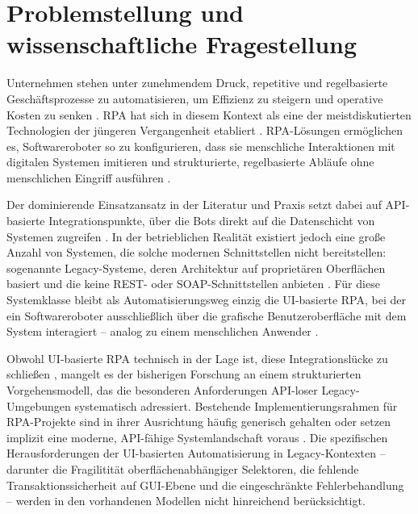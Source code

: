 \section{Problemstellung und wissenschaftliche Fragestellung}

Unternehmen stehen unter zunehmendem Druck, repetitive und regelbasierte 
Geschäftsprozesse zu automatisieren, um Effizienz zu steigern und operative 
Kosten zu senken \autocite[Vgl.][S.~269]{VanDerAalst2018}. \ac{RPA} 
hat sich in diesem Kontext als eine der meistdiskutierten Technologien der 
jüngeren Vergangenheit etabliert \autocite[Vgl.][S.~1]{Syed2020}. \acs{RPA}-Lösungen ermöglichen 
es, Softwareroboter so zu konfigurieren, dass sie menschliche Interaktionen mit 
digitalen Systemen imitieren und strukturierte, regelbasierte Abläufe ohne 
menschlichen Eingriff ausführen \autocite[Vgl.][S.~3]{CzarneckiFettke2021}.

Der dominierende Einsatzansatz in der Literatur und Praxis setzt dabei auf 
\acs{API}-basierte Integrationspunkte, über die Bots direkt auf die Datenschicht 
von Systemen zugreifen \autocite[Vgl.][S.~3]{HermJaniesch2022}. In der betrieblichen 
Realität existiert jedoch eine große Anzahl von Systemen, die solche modernen 
Schnittstellen nicht bereitstellen: sogenannte Legacy-Systeme, deren 
Architektur auf proprietären Oberflächen basiert und die keine \acs{REST}- oder 
\acs{SOAP}-Schnittstellen anbieten \autocite[Vgl.][S.~103]{Bisbal1999}. Für diese Systemklasse 
bleibt als Automatisierungsweg einzig die \acs{UI}-basierte \ac{RPA}, bei der ein 
Softwareroboter ausschließlich über die grafische Benutzeroberfläche mit dem 
System interagiert – analog zu einem menschlichen Anwender 
\autocite[Vgl.][S.~1]{AgostinelliLupia2022}.

Obwohl \acs{UI}-basierte \ac{RPA} technisch in der Lage ist, diese Integrationslücke zu 
schließen \autocite[Vgl.][S.~104]{RutschiDibbern2020}, mangelt es der bisherigen Forschung 
an einem strukturierten Vorgehensmodell, das die besonderen Anforderungen 
\acs{API}-loser Legacy-Umgebungen systematisch adressiert. Bestehende 
Implementierungsrahmen für \acs{RPA}-Projekte sind in ihrer Ausrichtung häufig 
generisch gehalten \autocite[Vgl.][S.~5]{KrakauFeldmann2023} oder setzen implizit eine 
moderne, \acs{API}-fähige Systemlandschaft voraus \autocite[Vgl.][S.~405]{SantosPereira2020}. Die 
spezifischen Herausforderungen der \acs{UI}-basierten Automatisierung in 
Legacy-Kontexten – darunter die Fragilitität oberflächenabhängiger Selektoren, 
die fehlende Transaktionssicherheit auf \acs{GUI}-Ebene und die eingeschränkte 
Fehlerbehandlung
– werden in den vorhandenen Modellen nicht hinreichend berücksichtigt.

